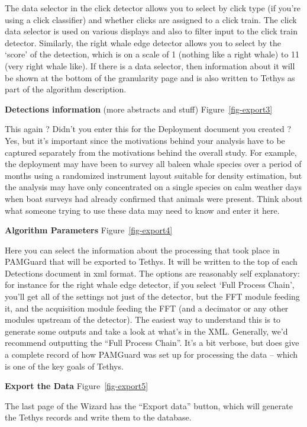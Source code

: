 \documentclass[
]{article}
\begin{document}
The data selector in the click detector allows you to select by click
type (if you're using a click classifier) and whether clicks are
assigned to a click train. The click data selector is used on various
displays and also to filter input to the click train detector.
Similarly, the right whale edge detector allows you to select by the
`score' of the detection, which is on a scale of 1 (nothing like a right
whale) to 11 (very right whale like). If there is a data selector, then
information about it will be shown at the bottom of the granularity page
and is also written to Tethys as part of the algorithm description.

\textbf{Detections information} (more abstracts and stuff)
Figure~\ref{fig-export3}

This again ? Didn't you enter this for the Deployment document you
created ? Yes, but it's important since the motivations behind your
analysis have to be captured separately from the motivations behind the
overall study. For example, the deployment may have been to survey all
baleen whale species over a period of months using a randomized
instrument layout suitable for density estimation, but the analysis may
have only concentrated on a single species on calm weather days when
boat surveys had already confirmed that animals were present. Think
about what someone trying to use these data may need to know and enter
it here.

\textbf{Algorithm Parameters} Figure~\ref{fig-export4}

Here you can select the information about the processing that took place
in PAMGuard that will be exported to Tethys. It will be written to the
top of each Detections document in xml format. The options are
reasonably self explanatory: for instance for the right whale edge
detector, if you select `Full Process Chain', you'll get all of the
settings not just of the detector, but the FFT module feeding it, and
the acquisition module feeding the FFT (and a decimator or any other
modules upstream of the detector). The easiest way to understand this is
to generate some outputs and take a look at what's in the XML.
Generally, we'd recommend outputting the ``Full Process Chain''. It's a
bit verbose, but does give a complete record of how PAMGuard was set up
for processing the data -- which is one of the key goals of Tethys.

\textbf{Export the Data} Figure~\ref{fig-export5}

The last page of the Wizard has the ``Export data'' button, which will
generate the Tethys records and write them to the database.
\end{document}
